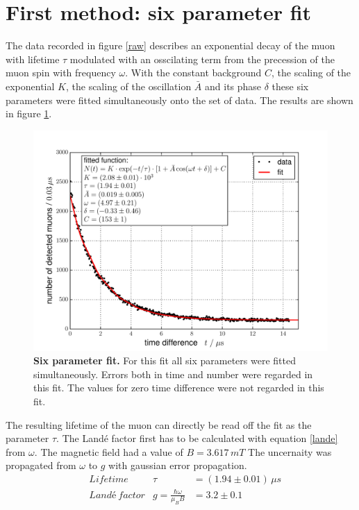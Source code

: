 \documentclass{include/thesisclass3}
\newcommand{\e}[1]{\,\si{#1}}
\begin{document}
\section{First method: six parameter fit}
\label{first}
The data recorded in figure \ref{raw} describes an exponential decay of the muon with lifetime $\tau$ modulated with an osscilating term from the precession of the muon spin with frequency $\omega$. 
With the constant background $C$, the scaling of the exponential $K$, the scaling of the oscillation $\bar A$ and its phase $\delta$ these six parameters were fitted simultaneously onto the set of data. The results are shown in figure \ref{6pm}.
\begin{figure}[H]
\centering
\includegraphics[width= 0.8 \textwidth]{images/6paramfit.pdf}
\caption{\label{6pm}\textbf{Six parameter fit.} For this fit all six parameters were fitted simultaneously. Errors both in time and number were regarded in this fit. The values for zero time difference were not regarded in this fit.}
\end{figure}
The resulting lifetime of the muon can directly be read off the fit as the parameter $\tau$. 
The Landé factor first has to be calculated with equation \ref{lande} from $\omega$. The magnetic field had a value of $B = 3.617\e{mT}$
The uncernaity was propagated from $\omega$ to $g$ with gaussian error propagation.
\begin{align}
&\e{Lifetime} &\tau &=(1.94\pm 0.01)\e{\mu s}\\
&\e{Landé~factor} &g = \frac{\hbar \omega}{\mu_B B} &=3.2 \pm 0.1
\end{align}
\end{document}
